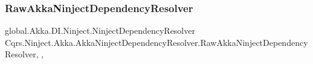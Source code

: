 \subsubsection{\texorpdfstring{Raw\+Akka\+Ninject\+Dependency\+Resolver}{RawAkkaNinjectDependencyResolver}}
{\footnotesize\ttfamily global.\+Akka.\+D\+I.\+Ninject.\+Ninject\+Dependency\+Resolver Cqrs.\+Ninject.\+Akka.\+Akka\+Ninject\+Dependency\+Resolver.\+Raw\+Akka\+Ninject\+Dependency\+Resolver\hspace{0.3cm}{\ttfamily [get]}, {\ttfamily [set]}, {\ttfamily [protected]}}

